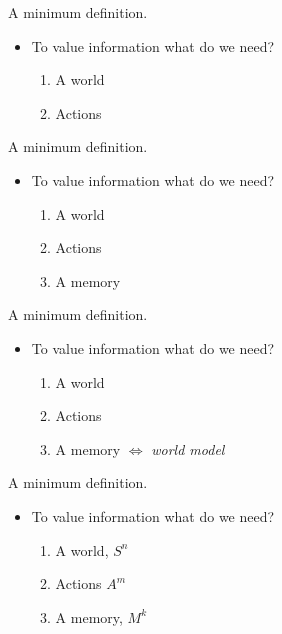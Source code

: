 \documentclass[10pt]{beamer}
\begin{document}
\begin{frame}[fragile]{A minimum definition.}
\begin{itemize}
    \item To value information what do we need?
    \begin{enumerate}
        \item A world
        \item Actions
    \end{enumerate}
\end{itemize}
\end{frame}

\begin{frame}[fragile]{A minimum definition.}
\begin{itemize}
    \item To value information what do we need?
    \begin{enumerate}
        \item A world
        \item Actions
        \item A memory
    \end{enumerate}
\end{itemize}
\end{frame}

\begin{frame}[fragile]{A minimum definition.}
\begin{itemize}
    \item To value information what do we need?
    \begin{enumerate}
        \item A world
        \item Actions
        \item A memory $\Leftrightarrow$ \textit{world model}
    \end{enumerate}
\end{itemize}
\end{frame}


\begin{frame}[fragile]{A minimum definition.}
\begin{itemize}
    \item To value information what do we need?
    \begin{enumerate}
        \item A world, $S^n$
        \item Actions $A^m$
        \item A memory, $M^k$
    \end{enumerate}
\end{itemize}
\end{frame}
        
\end{document}
